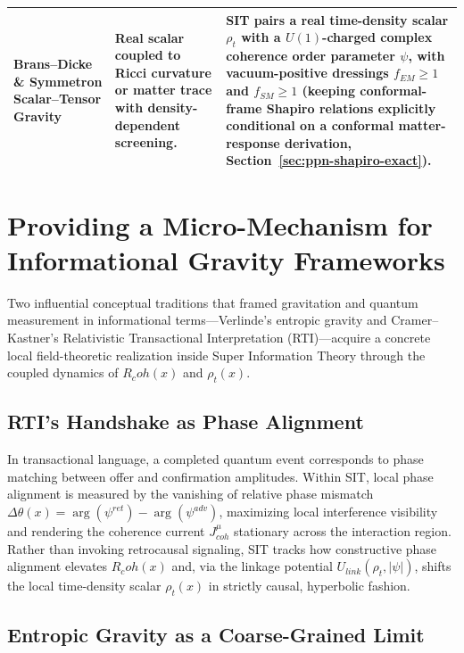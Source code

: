 \documentclass[american,11pt,letterpaper]{article}
\newcommand{\Rcoh}{R_{\mathrm{coh}}}
\def\mathrm#1{#1}%
\def\Rcoh{R_coh}%
\begin{document}
\begin{table}[htbp]
\begin{tabular}{|p{3.2cm}|p{4.8cm}|p{6.8cm}|}
\hline
\textbf{Brans--Dicke \& Symmetron Scalar--Tensor Gravity} & Real scalar coupled to Ricci curvature or matter trace with density-dependent screening. & SIT pairs a real time-density scalar $\rho_t$ with a $U(1)$-charged complex coherence order parameter $\psi$, with vacuum-positive dressings $f_{\mathrm{EM}} \ge 1$ and $f_{\mathrm{SM}} \ge 1$ (keeping conformal-frame Shapiro relations explicitly conditional on a conformal matter-response derivation, Section~\ref{sec:ppn-shapiro-exact}). \\
\hline
\end{tabular}
\end{table}

\section{Providing a Micro-Mechanism for Informational Gravity Frameworks}
\label{sec:entropic_RTI_SIT}

Two influential conceptual traditions that framed gravitation and quantum measurement in informational terms---Verlinde's entropic gravity and Cramer--Kastner's Relativistic Transactional Interpretation (RTI)---acquire a concrete local field-theoretic realization inside Super Information Theory through the coupled dynamics of $\Rcoh(x)$ and $\rho_t(x)$.

\subsection*{RTI's Handshake as Phase Alignment}

In transactional language, a completed quantum event corresponds to phase matching between offer and confirmation amplitudes. Within SIT, local phase alignment is measured by the vanishing of relative phase mismatch $\Delta\theta(x) = \arg(\psi^{\mathrm{ret}}) - \arg(\psi^{\mathrm{adv}})$, maximizing local interference visibility and rendering the coherence current $J^\mu_{\mathrm{coh}}$ stationary across the interaction region. Rather than invoking retrocausal signaling, SIT tracks how constructive phase alignment elevates $\Rcoh(x)$ and, via the linkage potential $U_{\mathrm{link}}(\rho_t, |\psi|)$, shifts the local time-density scalar $\rho_t(x)$ in strictly causal, hyperbolic fashion.

\subsection*{Entropic Gravity as a Coarse-Grained Limit}
\end{document}
